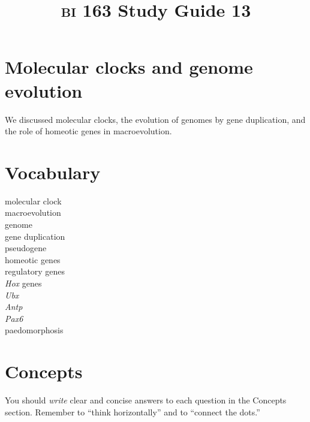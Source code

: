\documentclass[letterpaper]{tufte-handout}
\title{{\scshape bi} 163 Study Guide 13}
\date{} %
\begin{document}
\maketitle	%

\section*{Molecular clocks and genome evolution}

We discussed molecular clocks, the evolution of genomes by gene duplication, and the role of homeotic genes in macroevolution.

\section*{Vocabulary}

\vspace{-1\baselineskip}
\begin{multicols}{2}
molecular clock \\
macroevolution  \\
genome  \\
gene duplication  \\
pseudogene \\
homeotic genes \\
regulatory genes \\
\textit{Hox} genes \\
\textit{Ubx} \\
\textit{Antp} \\
\textit{Pax6} \\
paedomorphosis

\end{multicols}

\section*{Concepts}

You should \emph{write} clear and concise answers to each question in the Concepts section.  Remember to ``think horizontally'' and to ``connect the dots.'' 
\end{document}
